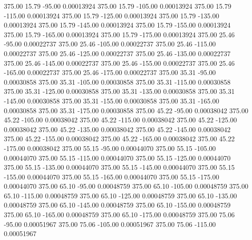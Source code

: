     375.00     15.79    -95.00     0.00013924
    375.00     15.79   -105.00     0.00013924
    375.00     15.79   -115.00     0.00013924
    375.00     15.79   -125.00     0.00013924
    375.00     15.79   -135.00     0.00013924
    375.00     15.79   -145.00     0.00013924
    375.00     15.79   -155.00     0.00013924
    375.00     15.79   -165.00     0.00013924
    375.00     15.79   -175.00     0.00013924
    375.00     25.46    -95.00     0.00022737
    375.00     25.46   -105.00     0.00022737
    375.00     25.46   -115.00     0.00022737
    375.00     25.46   -125.00     0.00022737
    375.00     25.46   -135.00     0.00022737
    375.00     25.46   -145.00     0.00022737
    375.00     25.46   -155.00     0.00022737
    375.00     25.46   -165.00     0.00022737
    375.00     25.46   -175.00     0.00022737
    375.00     35.31    -95.00     0.00030858
    375.00     35.31   -105.00     0.00030858
    375.00     35.31   -115.00     0.00030858
    375.00     35.31   -125.00     0.00030858
    375.00     35.31   -135.00     0.00030858
    375.00     35.31   -145.00     0.00030858
    375.00     35.31   -155.00     0.00030858
    375.00     35.31   -165.00     0.00030858
    375.00     35.31   -175.00     0.00030858
    375.00     45.22    -95.00     0.00038042
    375.00     45.22   -105.00     0.00038042
    375.00     45.22   -115.00     0.00038042
    375.00     45.22   -125.00     0.00038042
    375.00     45.22   -135.00     0.00038042
    375.00     45.22   -145.00     0.00038042
    375.00     45.22   -155.00     0.00038042
    375.00     45.22   -165.00     0.00038042
    375.00     45.22   -175.00     0.00038042
    375.00     55.15    -95.00     0.00044070
    375.00     55.15   -105.00     0.00044070
    375.00     55.15   -115.00     0.00044070
    375.00     55.15   -125.00     0.00044070
    375.00     55.15   -135.00     0.00044070
    375.00     55.15   -145.00     0.00044070
    375.00     55.15   -155.00     0.00044070
    375.00     55.15   -165.00     0.00044070
    375.00     55.15   -175.00     0.00044070
    375.00     65.10    -95.00     0.00048759
    375.00     65.10   -105.00     0.00048759
    375.00     65.10   -115.00     0.00048759
    375.00     65.10   -125.00     0.00048759
    375.00     65.10   -135.00     0.00048759
    375.00     65.10   -145.00     0.00048759
    375.00     65.10   -155.00     0.00048759
    375.00     65.10   -165.00     0.00048759
    375.00     65.10   -175.00     0.00048759
    375.00     75.06    -95.00     0.00051967
    375.00     75.06   -105.00     0.00051967
    375.00     75.06   -115.00     0.00051967
